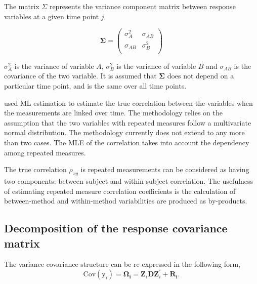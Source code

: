 \documentclass[12pt, a4paper]{report}
\theoremstyle{plain}
\theoremstyle{definition}
\theoremstyle{remark}
\begin{document}
The matrix $\Sigma$ represents the variance component matrix between response variables at a given time point $j$.

\[
\boldsymbol{\Sigma} = \left( \begin{array}{cc}
\sigma^2_{A} & \sigma_{AB} \\
\sigma_{AB} & \sigma^2_{B}\\
\end{array}   \right)
\]

$\sigma^2_{A}$ is the variance of variable $A$, $\sigma^2_{B}$ is the variance of variable $B$ and $\sigma_{AB}$ is the covariance of the two variable. It is assumed that $\boldsymbol{\Sigma}$ does not depend on a particular time point, and is the same over all time points.

\citet{Lam} used ML estimation to estimate the true correlation between the variables when
the measurements are linked over time. The methodology relies on the assumption that the two variables with repeated measures follow a multivariate normal distribution. The methodology currently does not extend to any more than two cases. The MLE of the correlation takes into account the dependency among repeated measures.

The true correlation $\rho_{xy}$ is repeated measurements can be considered as having two components: between subject and within-subject correlation. The usefulness of estimating repeated measure correlation coefficients is the calculation of between-method and within-method variabilities are produced as by-products.


\newpage

\subsection{Decomposition of the response covariance matrix}
The variance covariance structure can be re-expressed in the following form,
\[
\mbox{Cov}(\mbox{y}_{i}) = \boldsymbol{\Omega_{i}} = \boldsymbol{Z}_{i}\boldsymbol{D}\boldsymbol{Z}_{i}^\prime + \boldsymbol{R_{i}}.
\]
\end{document}
